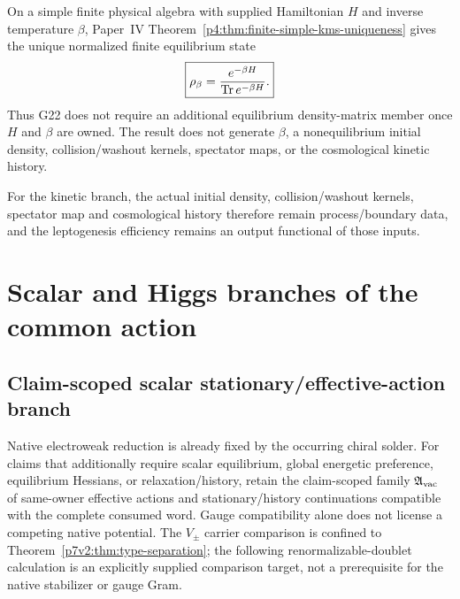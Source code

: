 \documentclass[12pt,a4paper]{article}
\begin{document}
\begin{corollary}
\label{p7:cor:finite-equilibrium-state-descendant}
On a simple finite physical algebra with supplied Hamiltonian $H$ and inverse
temperature $\beta$, Paper~IV
Theorem~\ref{p4:thm:finite-simple-kms-uniqueness} gives the unique normalized
finite equilibrium state
\[
 \boxed{\rho_\beta=\frac{e^{-\beta H}}{\operatorname{Tr} e^{-\beta H}}.}
\]
Thus G22 does not require an additional equilibrium density-matrix member once
$H$ and $\beta$ are owned.  The result does not generate $\beta$, a
nonequilibrium initial density, collision/washout kernels, spectator maps, or
the cosmological kinetic history.
\end{corollary}

For the kinetic branch, the actual initial density, collision/washout kernels,
spectator map and cosmological history therefore remain process/boundary data,
and the leptogenesis efficiency remains an output functional of those inputs.



\section{Scalar and Higgs branches of the common action}
\label{p5c:sec:organized-scalar}
\subsection{Claim-scoped scalar stationary/effective-action branch}
\label{p7v2:sec:ew-vacuum}

\begin{definition}
\label{p7v2:def:vacuum-selector-family}
Native electroweak reduction is already fixed by the occurring chiral solder.
For claims that additionally require scalar equilibrium, global energetic
preference, equilibrium Hessians, or relaxation/history, retain the
claim-scoped family \(\mathfrak A_{\rm vac}\) of same-owner effective actions
and stationary/history continuations compatible with the complete consumed
word.  Gauge compatibility alone does not license a competing native
potential.  The \(V_\pm\) carrier comparison is confined to
Theorem~\ref{p7v2:thm:type-separation}; the following renormalizable-doublet
calculation is an explicitly supplied comparison target, not a prerequisite
for the native stabilizer or gauge Gram.
\end{definition}
\end{document}
